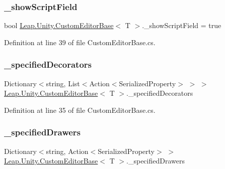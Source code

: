 \subsubsection{\texorpdfstring{\_showScriptField}{\_showScriptField}}
{\footnotesize\ttfamily bool \mbox{\hyperlink{class_leap_1_1_unity_1_1_custom_editor_base}{Leap.\+Unity.\+Custom\+Editor\+Base}}$<$ T $>$.\+\_\+show\+Script\+Field = true\hspace{0.3cm}{\ttfamily [protected]}}



Definition at line 39 of file Custom\+Editor\+Base.\+cs.

\mbox{\label{class_leap_1_1_unity_1_1_custom_editor_base_a78950630f8436e49843b8731e03d61ff}} 
\subsubsection{\texorpdfstring{\_specifiedDecorators}{\_specifiedDecorators}}
{\footnotesize\ttfamily Dictionary$<$string, List$<$Action$<$Serialized\+Property$>$ $>$ $>$ \mbox{\hyperlink{class_leap_1_1_unity_1_1_custom_editor_base}{Leap.\+Unity.\+Custom\+Editor\+Base}}$<$ T $>$.\+\_\+specified\+Decorators\hspace{0.3cm}{\ttfamily [protected]}}



Definition at line 35 of file Custom\+Editor\+Base.\+cs.

\mbox{\label{class_leap_1_1_unity_1_1_custom_editor_base_a21f5584239f225187cba8a64f253e282}} 
\subsubsection{\texorpdfstring{\_specifiedDrawers}{\_specifiedDrawers}}
{\footnotesize\ttfamily Dictionary$<$string, Action$<$Serialized\+Property$>$ $>$ \mbox{\hyperlink{class_leap_1_1_unity_1_1_custom_editor_base}{Leap.\+Unity.\+Custom\+Editor\+Base}}$<$ T $>$.\+\_\+specified\+Drawers\hspace{0.3cm}{\ttfamily [protected]}}



